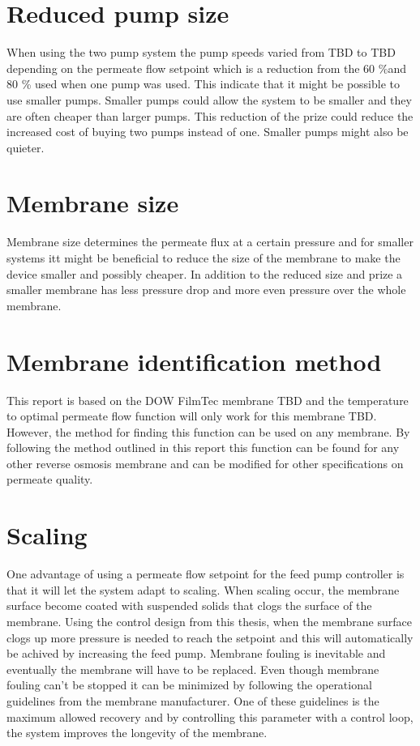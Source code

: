 \section{Reduced pump size}
When using the two pump system the pump speeds varied from TBD to TBD depending on the permeate flow setpoint which is a reduction from the 60 \%and 80 \% used when one pump was used. This indicate that it might be possible to use smaller pumps. Smaller pumps could allow the system to be smaller and they are often cheaper than larger pumps. This reduction of the prize could reduce the increased cost of buying two pumps instead of one. Smaller pumps might also be quieter.

\section{Membrane size}
Membrane size determines the permeate flux at a certain pressure and for smaller systems itt might be beneficial to reduce the size of the membrane to make the device smaller and possibly cheaper. In addition to the reduced size and prize a smaller membrane has less pressure drop and more even pressure over the whole membrane.

\section{Membrane identification method}
This report is based on the DOW FilmTec membrane TBD and the temperature to optimal permeate flow function will only work for this membrane TBD. However, the method for finding this function can be used on any membrane. By following the method outlined in this report this function can be found for any other reverse osmosis membrane and can be modified for other specifications on permeate quality. 

\section{Scaling}
One advantage of using a permeate flow setpoint for the feed pump controller is that it will let the system adapt to scaling. When scaling occur, the membrane surface become coated with suspended solids that clogs the surface of the membrane. Using the control design from this thesis, when the membrane surface clogs up more pressure is needed to reach the setpoint and this will automatically be achived by increasing the feed pump. Membrane fouling is inevitable and eventually the membrane will have to be replaced. Even though membrane fouling can't be stopped it can be minimized by following the operational guidelines from the membrane manufacturer. One of these guidelines is the maximum allowed recovery and by controlling this parameter with a control loop, the system improves the longevity of the membrane. 

